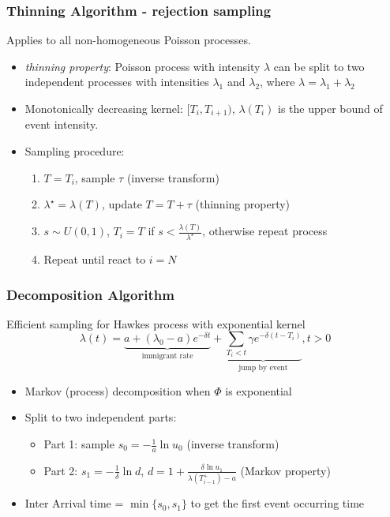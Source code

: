 \documentclass{beamer}
\begin{document}
\begin{frame}
\frametitle{Thinning Algorithm - rejection sampling}
Applies to all non-homogeneous Poisson processes. 
\begin{itemize}
	\item \textit{thinning property}: Poisson process with intensity $\lambda$ can be split to two independent processes with intensities $\lambda_1$ and $\lambda_2$, where $\lambda = \lambda_1+\lambda_2$
	\item Monotonically decreasing kernel: $[T_i,T_{i+1})$, $\lambda(T_i)$ is the upper bound of event intensity.
	\item Sampling procedure:
	\begin{enumerate}
		\item $T=T_i$, sample $\tau$ (inverse transform)
		\item $\lambda^{\star}=\lambda(T)$, update $T=T+\tau$ (thinning property)
		\item $s\sim U(0,1)$, $T_i=T$ if $s<\frac{\lambda(T)}{\lambda^{\star}}$, otherwise repeat process
		\item Repeat until react to $i=N$
	\end{enumerate}
\end{itemize}
\end{frame}

\begin{frame}
\frametitle{Decomposition Algorithm}
Efficient sampling for Hawkes process with exponential kernel
\[\lambda(t)=\underbrace{a+(\lambda_0-a)e^{-\delta t}}_{\text{immigrant rate}}+\underbrace{\sum_{T_i<t}\gamma e^{-\delta(t-T_i)}}_{\text{jump by event}}, t>0 \]
\begin{itemize}
	\item Markov (process) decomposition when $\Phi$ is exponential
	\item Split to two independent parts:
	\begin{itemize}
		\item Part 1: sample $s_0=-\frac{1}{a}\ln u_0$ (inverse transform)
	\item Part 2: $s_1=-\frac{1}{\delta}\ln d$, $d=1+\frac{\delta \ln u_1}{\lambda(T^+_{i-1})-a}$ (Markov property)
	\end{itemize}
	\item Inter Arrival time = $\min\{s_0,s_1\}$ to get the first event occurring time
\end{itemize}
\end{frame}
\end{document}
